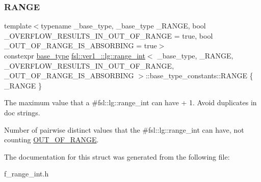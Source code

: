 \subsubsection{\texorpdfstring{RANGE}{RANGE}}
{\footnotesize\ttfamily template$<$typename \+\_\+base\+\_\+type, \+\_\+base\+\_\+type \+\_\+\+R\+A\+N\+GE, bool \+\_\+\+O\+V\+E\+R\+F\+L\+O\+W\+\_\+\+R\+E\+S\+U\+L\+T\+S\+\_\+\+I\+N\+\_\+\+O\+U\+T\+\_\+\+O\+F\+\_\+\+R\+A\+N\+GE = true, bool \+\_\+\+O\+U\+T\+\_\+\+O\+F\+\_\+\+R\+A\+N\+G\+E\+\_\+\+I\+S\+\_\+\+A\+B\+S\+O\+R\+B\+I\+NG = true$>$ \\
constexpr \mbox{\hyperlink{classfsl_1_1ver1__0_1_1lg_1_1range__int_af14c814b65a761cd387e7577eb2ef78c}{base\+\_\+type}} \mbox{\hyperlink{classfsl_1_1ver1__0_1_1lg_1_1range__int}{fsl\+::ver1\+\_\+::lg\+::range\+\_\+int}}$<$ \+\_\+base\+\_\+type, \+\_\+\+R\+A\+N\+GE, \+\_\+\+O\+V\+E\+R\+F\+L\+O\+W\+\_\+\+R\+E\+S\+U\+L\+T\+S\+\_\+\+I\+N\+\_\+\+O\+U\+T\+\_\+\+O\+F\+\_\+\+R\+A\+N\+GE, \+\_\+\+O\+U\+T\+\_\+\+O\+F\+\_\+\+R\+A\+N\+G\+E\+\_\+\+I\+S\+\_\+\+A\+B\+S\+O\+R\+B\+I\+NG $>$\+::base\+\_\+type\+\_\+constants\+::\+R\+A\+N\+GE \{ \+\_\+\+R\+A\+N\+GE \}\hspace{0.3cm}{\ttfamily [static]}}



The maximum value that a \#fsl\+::lg\+::range\+\_\+int can have + 1. Avoid duplicates in doc strings. 

Number of pairwise distinct values that the \#fsl\+::lg\+::range\+\_\+int can have, not counting \mbox{\hyperlink{structfsl_1_1ver1__0_1_1lg_1_1range__int_1_1base__type__constants_aa642cbda71ab83195d543c3d415175c5}{O\+U\+T\+\_\+\+O\+F\+\_\+\+R\+A\+N\+GE}}. 

The documentation for this struct was generated from the following file\+:\begin{DoxyCompactItemize}
\item 
f\+\_\+range\+\_\+int.\+h\end{DoxyCompactItemize}
